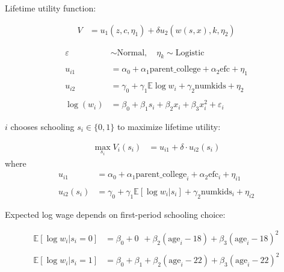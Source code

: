 \documentclass[aspectratio=169]{beamer}
\begin{document}
\begin{frame}\frametitle{}
Lifetime utility function:

\begin{align*}
V & = u_1\left(z,c,\eta_1\right) + \delta u_2\left(w\left(s,x\right),k,\eta_2\right)
\label{eq:PDV}
\end{align*}

\end{frame}




\begin{frame}




\begin{align*}
\varepsilon &\sim \text{Normal}, \quad \eta_k \sim \text{Logistic} \\
& \\
u_{i1} &= \alpha_0 + \alpha_1 \text{parent\_college} + \alpha_2 \text{efc} + \eta_1 \\
& \\
u_{i2} &= \gamma_0 + \gamma_1 \mathbb{E} \log w_i + \gamma_2 \text{numkids} + \eta_2 \\
& \\
\log(w_{i}) &= \beta_0 + \beta_1 s_{i} + \beta_2 x_{i} + \beta_3 x^2_{i} + \varepsilon_{i}
\end{align*}

\end{frame}



\begin{frame}

$i$ chooses schooling $s_i \in \{0,1\}$ to maximize lifetime utility:

\begin{align*}
\max_{s_i} V_i(s_i) &= u_{i1} + \delta \cdot u_{i2}(s_i)
\end{align*}
where
\begin{align*}
u_{i1} &= \alpha_0 + \alpha_1 \text{parent\_college}_i + \alpha_2 \text{efc}_i + \eta_{i1} \\
&\\
u_{i2}(s_i) &= \gamma_0 + \gamma_1 \mathbb{E}[\log w_i | s_i] + \gamma_2 \text{numkids}_i + \eta_{i2}
\end{align*}


\end{frame}





\begin{frame}

Expected log wage depends on first-period schooling choice:

\begin{align*}
\mathbb{E}[\log w_i | s_i = 0] &= \beta_0 + 0\phantom{_1}    + \beta_2 (\text{age}_i - 18) + \beta_3 (\text{age}_i - 18)^2 \\
&\\
\mathbb{E}[\log w_i | s_i = 1] &= \beta_0 + \beta_1 + \beta_2 (\text{age}_i - 22) + \beta_3 (\text{age}_i - 22)^2
\end{align*}

\end{frame}
\end{document}
